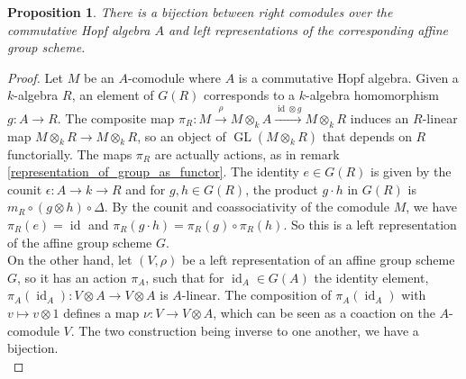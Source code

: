 \documentclass{article}
\theoremstyle{plain}
\newtheorem{proposition}[theorem]{Proposition}
\theoremstyle{definition}
\DeclareMathOperator{\GL}{GL}
\DeclareMathOperator{\id}{id}
\begin{document}
\begin{proposition}
\label{representations_iso_comodules}
    There is a bijection between right comodules over the commutative Hopf algebra $A$ and left representations of the corresponding affine group scheme.
\end{proposition}
\begin{proof}
    Let $M$ be an $A$-comodule where $A$ is a commutative Hopf algebra.
    Given a $k$-algebra $R$, an element of $G(R)$ corresponds to a $k$-algebra homomorphism $g: A\rightarrow R$.
    The composite map $\pi_R : M\xrightarrow{\rho}M\otimes_kA\xrightarrow{\id\otimes g} M\otimes_kR$ induces an $R$-linear map $M\otimes_kR\rightarrow M\otimes_kR$, so an object of $\GL(M\otimes_kR)$ that depends on $R$ functorially.
    The maps $\pi_R$ are actually actions, as in remark \ref{representation_of_group_as_functor}.
    The identity $e\in G(R)$ is given by the counit $\epsilon:A\rightarrow k \rightarrow R$ and for $g,h\in G(R)$, the product $g\cdot h$ in $G(R)$ is $m_R\circ (g\otimes h) \circ \Delta$.
    By the counit and coassociativity of the comodule $M$, we have $\pi_R(e) = \id$ and $\pi_R(g\cdot h) = \pi_R(g)\circ\pi_R(h)$. 
    So this is a left representation of the affine group scheme $G$.\\
    On the other hand, let $(V,\rho)$ be a left representation of an affine group scheme $G$, so it has an action $\pi_A$, such that for $\id_A\in G(A)$ the identity element, $\pi_A(\id_A):V\otimes A\rightarrow V\otimes A$ is $A$-linear.
    The composition of $\pi_A(\id_A)$ with $v\mapsto v\otimes 1$ defines a map $\nu:V\rightarrow V\otimes A$, which can be seen as a coaction on the $A$-comodule $V$.
    The two construction being inverse to one another, we have a bijection.\\
    
\end{proof}
\end{document}
